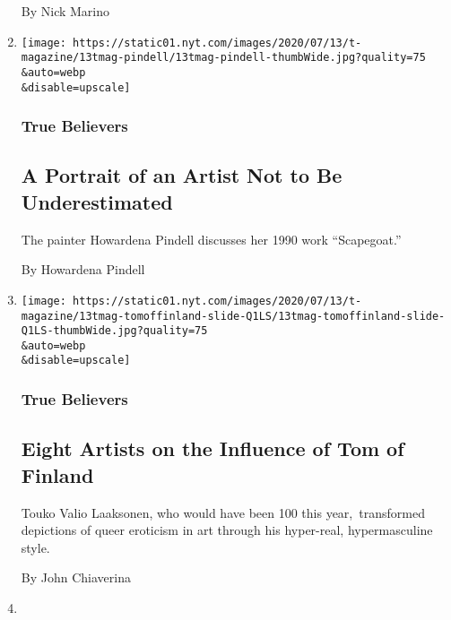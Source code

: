 \begin{enumerate}
  By Nick Marino
\item
  \href{/2020/07/24/t-magazine/howardena-pindell.html}{}

  \texttt{[image: https://static01.nyt.com/images/2020/07/13/t-magazine/13tmag-pindell/13tmag-pindell-thumbWide.jpg?quality=75\\\&auto=webp\\\&disable=upscale]}

  \hypertarget{true-believers-1}{%
  \subsubsection{True Believers}\label{true-believers-1}}

  \hypertarget{a-portrait-of-an-artist-not-to-be-underestimated}{%
  \subsection{A Portrait of an Artist Not to Be
  Underestimated}\label{a-portrait-of-an-artist-not-to-be-underestimated}}

  The painter Howardena Pindell discusses her 1990 work ``Scapegoat.''

  By Howardena Pindell
\item
  \href{/2020/07/23/t-magazine/tom-of-finland.html}{}

  \texttt{[image: https://static01.nyt.com/images/2020/07/13/t-magazine/13tmag-tomoffinland-slide-Q1LS/13tmag-tomoffinland-slide-Q1LS-thumbWide.jpg?quality=75\\\&auto=webp\\\&disable=upscale]}

  \hypertarget{true-believers-2}{%
  \subsubsection{True Believers}\label{true-believers-2}}

  \hypertarget{eight-artists-on-the-influence-of-tom-of-finland}{%
  \subsection{Eight Artists on the Influence of Tom of
  Finland}\label{eight-artists-on-the-influence-of-tom-of-finland}}

  Touko Valio Laaksonen, who would have been 100 this year,~transformed
  depictions of queer eroticism in art through his hyper-real,
  hypermasculine style.

  By John Chiaverina
\item
  \href{/2020/07/23/t-magazine/jewish-museum-new-york.html}{}


\end{enumerate}
